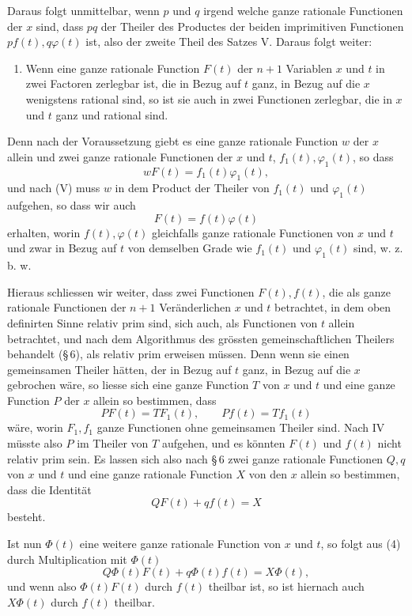 \documentclass[11pt]{article}
\begin{document}
Daraus folgt unmittelbar, wenn $p$ und $q$ irgend welche ganze rationale Functionen der $x$ sind, dass $pq$ der Theiler des Productes der beiden imprimitiven Functionen $pf(t),q\varphi(t)$ ist, also der zweite Theil des Satzes V. Daraus folgt weiter:

\begin{enumerate}[label=\Roman*.,leftmargin=2.4em,start=6]
\item Wenn eine ganze rationale Function $F(t)$ der $n+1$ Variablen $x$ und $t$ in zwei Factoren zerlegbar ist, die in Bezug auf $t$ ganz, in Bezug auf die $x$ wenigstens rational sind, so ist sie auch in zwei Functionen zerlegbar, die in $x$ und $t$ ganz und rational sind.
\end{enumerate}

Denn nach der Voraussetzung giebt es eine ganze rationale Function $w$ der $x$ allein und zwei ganze rationale Functionen der $x$ und $t$, $f_1(t),\varphi_1(t)$, so dass
\[
wF(t)=f_1(t)\varphi_1(t),
\]
und nach (V) muss $w$ in dem Product der Theiler von $f_1(t)$ und $\varphi_1(t)$ aufgehen, so dass wir auch
\[
F(t)=f(t)\varphi(t)
\]
erhalten, worin $f(t),\varphi(t)$ gleichfalls ganze rationale Functionen von $x$ und $t$ und zwar in Bezug auf $t$ von demselben Grade wie $f_1(t)$ und $\varphi_1(t)$ sind, w. z. b. w.

Hieraus schliessen wir weiter, dass zwei Functionen $F(t),f(t)$, die als ganze rationale Functionen der $n+1$ Veränderlichen $x$ und $t$ betrachtet, in dem oben definirten Sinne relativ prim sind, sich auch, als Functionen von $t$ allein betrachtet, und nach dem Algorithmus des grössten gemeinschaftlichen Theilers behandelt (\S\,6), als relativ prim erweisen müssen. Denn wenn sie einen gemeinsamen Theiler hätten, der in Bezug auf $t$ ganz, in Bezug auf die $x$ gebrochen wäre, so liesse sich eine ganze Function $T$ von $x$ und $t$ und eine ganze Function $P$ der $x$ allein so bestimmen, dass
\[
PF(t)=TF_1(t),\qquad Pf(t)=Tf_1(t)
\]
wäre, worin $F_1,f_1$ ganze Functionen ohne gemeinsamen Theiler sind. Nach IV müsste also $P$ im Theiler von $T$ aufgehen, und es könnten $F(t)$ und $f(t)$ nicht relativ prim sein. Es lassen sich also nach \S\,6 zwei ganze rationale Functionen $Q,q$ von $x$ und $t$ und eine ganze rationale Function $X$ von den $x$ allein so bestimmen, dass die Identität
\begin{equation}
QF(t)+qf(t)=X
\tag{4}
\end{equation}
besteht.

Ist nun $\Phi(t)$ eine weitere ganze rationale Function von $x$ und $t$, so folgt aus (4) durch Multiplication mit $\Phi(t)$
\[
Q\Phi(t)F(t)+q\Phi(t)f(t)=X\Phi(t),
\]
und wenn also $\Phi(t)F(t)$ durch $f(t)$ theilbar ist, so ist hiernach auch $X\Phi(t)$ durch $f(t)$ theilbar.
\end{document}
